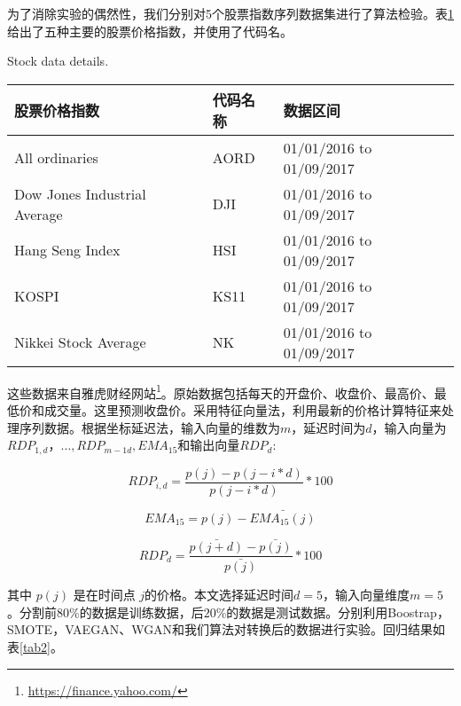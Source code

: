 为了消除实验的偶然性，我们分别对5个股票指数序列数据集进行了算法检验。表\ref{tab1}给出了五种主要的股票价格指数，并使用了代码名。

\begin{table}[hpb]
	\centering
	{Stock data details.}
	\label{tab1}
	\begin{tabular}{lll} \toprule
		股票价格指数   & 代码名称 &  数据区间  \\  \midrule
		All ordinaries   & AORD&  01/01/2016 to 01/09/2017 \\
		Dow Jones Industrial Average   & DJI&01/01/2016 to 01/09/2017\\
		Hang Seng Index   & HSI&   01/01/2016 to 01/09/2017\\
		KOSPI   & KS11& 01/01/2016 to 01/09/2017\\
		Nikkei Stock Average   &NK&   01/01/2016 to 01/09/2017\\
		\bottomrule
	\end{tabular}
\end{table}

这些数据来自雅虎财经网站\footnote{\url{https://finance.yahoo.com/}}。原始数据包括每天的开盘价、收盘价、最高价、最低价和成交量。这里预测收盘价。采用特征向量法\cite{18}，利用最新的价格计算特征来处理序列数据。根据坐标延迟法，输入向量的维数为$m$，延迟时间为$d$，输入向量为$RDP_{1,d}，…,RDP_ {m - 1 d}, EMA_{15}$和输出向量$RDP_ {d} $:

\begin{equation}
\label{eq16}
RDP_{i,d} = \frac{p(j)-p(j-i*d)}{p(j-i*d)}*100
\end{equation}


\begin{equation}
\label{eq17}
EMA_{15}  = p(j)-\bar{EMA_{15}(j)}
\end{equation}

\begin{equation}
\label{eq18}
RDP_{d} = \frac{\bar{p(j+d)}-\bar{p(j)}}{\bar{p(j)}}*100
\end{equation}


其中 $p(j)$ 是在时间点 $j$的价格。本文选择延迟时间$d=5$，输入向量维度$m=5$。分割前$80\% $的数据是训练数据，后$20\% $的数据是测试数据。分别利用Boostrap，SMOTE，VAEGAN、WGAN和我们算法对转换后的数据进行实验。回归结果如表\ref{tab2}。

